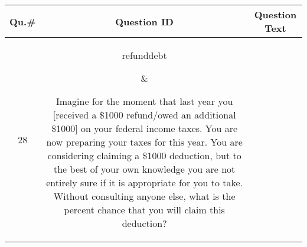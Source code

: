 \begin{table}[!h]
\footnotesize
{}
{
\setlength{\extrarowheight}{15pt}
 \begin{tabular}{|c|c|c|}\hline
\bf{Qu.\#} & \bf{Question ID} & \bf{Question Text}\\ \hline \hline 


28&  \parbox[c][0.05\textheight][c]{0.17\textwidth} { refunddebt  } &   \parbox[c][0.12\textheight][c]{0.68\textwidth} {Imagine for the moment that last year you [received a \$1000 refund/owed an additional \$1000] on your federal income taxes.  You are now preparing your taxes for this year.  You are considering claiming a \$1000 deduction, but to the best of your own knowledge you are not entirely sure if it is appropriate for you to take.  Without consulting anyone else, what is the percent chance that you will claim this deduction?}
\\  \hline

\end{tabular}
}
\end{table}